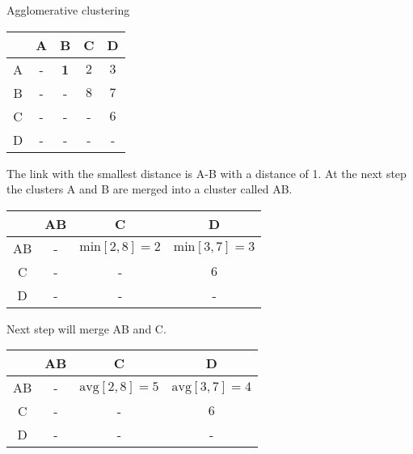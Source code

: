 \begin{example}
  \small
  \centering
  \caption{Agglomerative clustering}
  \label{ex:agglomerative_clustering}

  \begin{subexample}{\linewidth}
    \centering
    \begin{tabular}{c|c c c c}
      \toprule
        & A & B & C & D \\
      \midrule
      A & - & \textbf{1} & $2$ & $3$ \\
      B & - & - & $8$ & $7$\\
      C & - & - & - & $6$ \\
      D & - & - & - & - \\
      \bottomrule
    \end{tabular}
  \end{subexample}

  \vspace{0.2cm}
  The link with the smallest distance is A-B with a distance of 1.
  At the next step the clusters A and B are merged into a cluster called AB.

  \vspace{0.5cm}

  \begin{subexample}{\linewidth}
    \centering
    \begin{tabular}{c|c c c}
      \toprule
        & AB & C & D \\
      \midrule
      AB & - & $\text{min} \left[2, 8 \right] = 2$ & $\text{min} \left[3, 7 \right] = 3$ \\
      C  & - & - & $6$ \\
      D  & - & - & - \\
      \bottomrule
    \end{tabular}
  \end{subexample}

  \vspace{0.2cm}
  Next step will merge AB and C.

  \vspace{0.5cm}

  \begin{subexample}{\linewidth}
    \centering
    \begin{tabular}{c|c c c}
      \toprule
        & AB & C & D \\
      \midrule
      AB & - & $\text{avg} \left[2, 8 \right] = 5$ & $\text{avg} \left[3, 7 \right] = 4$ \\
      C  & - & - & $6$ \\
      D  & - & - & - \\
      \bottomrule
    \end{tabular}
  \end{subexample}


\end{example}
